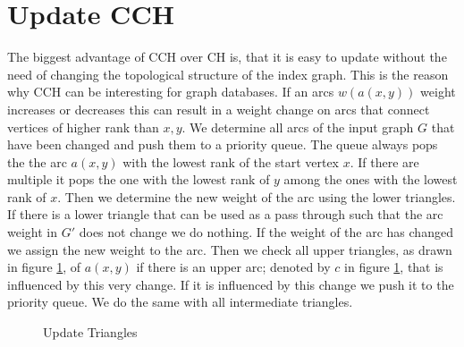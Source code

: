 \section{Update CCH}



The biggest advantage of CCH over CH is, that it is easy to update without the need of changing the topological structure of the index graph. This is the reason why CCH can be interesting for graph databases.
If an arcs $w(a(x, y))$ weight increases or decreases this can result in a weight change on arcs that connect vertices of higher rank than $x, y$. We determine all arcs of the input graph $G$ that have been changed 
and push them to a priority queue. The queue always pops the the arc $a(x,y)$ with the lowest rank of the start vertex $x$. If there are multiple it pops the one with the lowest rank of $y$ among the ones with the lowest rank of $x$. Then we determine 
the new weight of the arc using the lower triangles. If there is a lower triangle that can be used as a pass through such that the arc weight in $G'$ does not change we do nothing. If the weight of the arc has changed
we assign the new weight to the arc. Then we check all upper triangles, as drawn in figure \ref{fig:updateTriangles}, of $a(x,y)$ if there is an upper arc; denoted by $c$ in figure \ref{fig:updateTriangles}, that is influenced by this very change. If it is influenced by this
change we push it to the priority queue. We do the same with all intermediate triangles. 
\\


\begin{figure}
    \centering
    
    \caption{Update Triangles}
    \label{fig:updateTriangles}
\end{figure}


%
